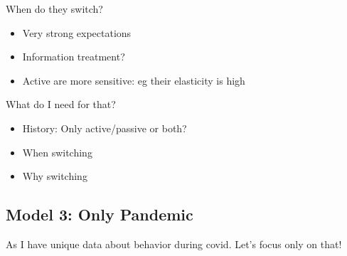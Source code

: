 \documentclass[ProjectABM]{subfiles}
\begin{document}
When do they switch? 
\begin{itemize}
	\item Very strong expectations
	\item Information treatment?
	\item Active are more sensitive: eg their elasticity is high
\end{itemize}

What do I need for that?
\begin{itemize}
	\item History: Only active/passive or both?
	\item When switching
	\item Why switching
\end{itemize}


\subsection{Model 3: Only Pandemic}
As I have unique data about behavior during covid. Let's focus only on that!

\onlyinsubfile{}
%
\end{document}
